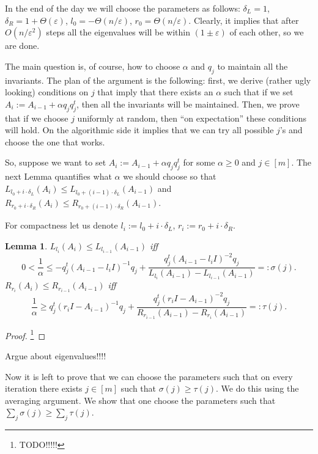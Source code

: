 \documentclass[12pt]{article}
\newcommand{\eps}{\varepsilon}
\newtheorem{lemma}{Lemma}
\begin{document}
    In the end of the day we will choose the parameters as follows: $\delta_L = 1$,
    $\delta_R = 1 + \Theta(\eps)$, $l_0 = -\Theta(n / \eps)$, $r_0 = \Theta(n / \eps)$.
    Clearly, it implies that after $O(n / \eps^2)$ steps all the eigenvalues will be
    within $(1 \pm \eps)$ of each other, so we are done.

    The main question is, of course, how to choose $\alpha$ and $q_j$ to maintain all the
    invariants. The plan of the argument is the following: first, we derive
    (rather ugly looking) conditions on $j$ that imply that there exists an $\alpha$ such
    that if we set $A_i := A_{i-1} + \alpha q_j q_j^t$, then all the invariants will be
    maintained. Then, we prove that if we choose $j$ uniformly at random, then
    ``on expectation'' these conditions will hold.
    On the algorithmic side it implies that we can try all possible $j$'s and choose the
    one that works.

    So, suppose we want to set $A_i := A_{i-1} + \alpha q_j q_j^t$ for some $\alpha \geq 0$
    and $j \in [m]$. The next Lemma quantifies what $\alpha$ we should choose so that
    $L_{l_0 + i \cdot \delta_L}(A_i) \leq L_{l_0 + (i - 1) \cdot \delta_L}(A_{i-1})$
    and $R_{r_0 + i \cdot \delta_R}(A_i) \leq R_{r_0 + (i - 1) \cdot \delta_R}(A_{i-1})$.

    For compactness let us denote $l_i := l_0 + i \cdot \delta_L$,
    $r_i := r_0 + i \cdot \delta_R$.

    \begin{lemma}
      $L_{l_i}(A_i) \leq L_{l_{i-1}}(A_{i-1})$
      iff
      $$
        0 < \frac{1}{\alpha} \leq -q_j^t (A_{i-1} - l_i I)^{-1} q_j +
        \frac{q_j^t (A_{i-1} - l_i I)^{-2}q_j}{L_{l_i}(A_{i-1}) - L_{l_{i-1}}(A_{i-1})}
        =: \sigma(j).
      $$
      $R_{r_i}(A_i) \leq R_{r_{i-1}}(A_{i-1})$ iff
      $$
        \frac{1}{\alpha} \geq q_j^t (r_i I - A_{i-1})^{-1} q_j +
        \frac{q_j^t (r_i I - A_{i-1})^{-2} q_j}{R_{r_{i-1}}(A_{i-1}) - R_{r_i}(A_{i-1})}
        =: \tau(j). 
      $$
    \end{lemma}
    \begin{proof}
        \footnote{TODO!!!!!}
    \end{proof}

    Argue about eigenvalues!!!!
    
    Now it is left to prove that we can choose the parameters such that on every 
    iteration there exists
    $j \in [m]$ such that $\sigma(j) \geq \tau(j)$.
    We do this using the averaging argument. We show that one choose the parameters such
    that $\sum_j \sigma(j) \geq \sum_j \tau(j)$.
\end{document}

